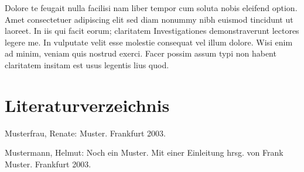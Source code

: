 \documentclass[a4paper,12pt]{scrartcl}
\begin{document}
Dolore te feugait nulla facilisi nam liber tempor cum soluta nobis eleifend option. Amet consectetuer adipiscing elit sed diam nonummy nibh euismod tincidunt ut laoreet. In iis qui facit eorum; claritatem Investigationes demonstraverunt lectores legere me. In vulputate velit esse molestie consequat vel illum dolore. Wisi enim ad minim, veniam quis nostrud exerci. Facer possim assum typi non habent claritatem insitam est usus legentis lius quod.

\clearpage

\section{Literaturverzeichnis}

Musterfrau, Renate: Muster. Frankfurt 2003.


Mustermann, Helmut: Noch ein Muster. Mit einer Einleitung hrsg. von Frank Muster. Frankfurt 2003.
\end{document}
